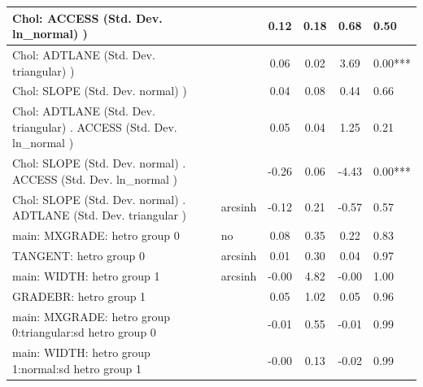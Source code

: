 \begin{table}
\begin{center}
\begin{tabular}{|l|l|c|c|c|l|}
			\hline
			 Chol: ACCESS (Std. Dev. ln_normal) ) &  & 0.12 & 0.18 & 0.68 & 0.50 \\
			\hline
			 Chol: ADTLANE (Std. Dev. triangular) ) &  & 0.06 & 0.02 & 3.69 & 0.00*** \\
			\hline
			 Chol: SLOPE (Std. Dev. normal) ) &  & 0.04 & 0.08 & 0.44 & 0.66 \\
			\hline
			 Chol: ADTLANE (Std. Dev. triangular) . ACCESS (Std. Dev.   ln_normal ) &  & 0.05 & 0.04 & 1.25 & 0.21 \\
			\hline
			 Chol: SLOPE (Std. Dev. normal) . ACCESS (Std. Dev.   ln_normal ) &  & -0.26 & 0.06 & -4.43 & 0.00*** \\
			\hline
			 Chol: SLOPE (Std. Dev. normal) . ADTLANE (Std. Dev.   triangular ) & arcsinh & -0.12 & 0.21 & -0.57 & 0.57 \\
			\hline
			main: MXGRADE: hetro group 0 & no & 0.08 & 0.35 & 0.22 & 0.83 \\
			\hline
			TANGENT: hetro group 0 & arcsinh & 0.01 & 0.30 & 0.04 & 0.97 \\
			\hline
			main: WIDTH: hetro group 1 & arcsinh & -0.00 & 4.82 & -0.00 & 1.00 \\
			\hline
			GRADEBR: hetro group 1 &  & 0.05 & 1.02 & 0.05 & 0.96 \\
			\hline
			main: MXGRADE: hetro group 0:triangular:sd  hetro group 0 &  & -0.01 & 0.55 & -0.01 & 0.99 \\
			\hline
			main: WIDTH: hetro group 1:normal:sd  hetro group 1 &  & -0.00 & 0.13 & -0.02 & 0.99 \\
			\hline
		\end{tabular}
	\end{center}
\end{table}